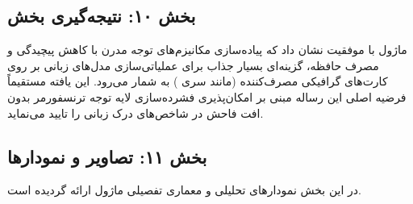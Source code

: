 \subsection*{بخش ۱۰: نتیجه‌گیری بخش }
ماژول  با موفقیت نشان داد که پیاده‌سازی مکانیزم‌های توجه مدرن با کاهش پیچیدگی و مصرف حافظه، گزینه‌ای بسیار جذاب برای عملیاتی‌سازی مدل‌های زبانی بر روی کارت‌های گرافیکی مصرف‌کننده (مانند سری ) به شمار می‌رود. این یافته مستقیماً فرضیه اصلی این رساله مبنی بر امکان‌پذیری فشرده‌سازی لایه توجه ترنسفورمر بدون افت فاحش در شاخص‌های درک زبانی را تایید می‌نماید.

\subsection*{بخش ۱۱: تصاویر و نمودارها }
در این بخش نمودارهای تحلیلی و معماری تفصیلی ماژول ارائه گردیده است.
